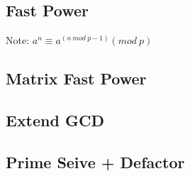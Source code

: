 \documentclass[twocolumn]{article}
\begin{document}
\subsection{Fast Power}
Note: $a^n \equiv a^{(n \ mod \ p-1)} (mod \ p)$


\subsection{Matrix Fast Power}


\subsection{Extend GCD}


\subsection{Prime Seive + Defactor}

\end{document}
